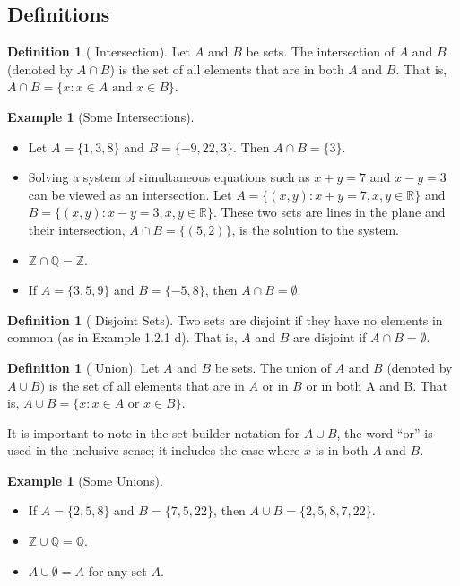 \documentclass[10pt,]{book}
\theoremstyle{plain}
\theoremstyle{definition}
\newtheorem{definition}[theorem]{Definition}
\theoremstyle{definition}
\theoremstyle{definition}
\newtheorem{example}[theorem]{Example}
\theoremstyle{definition}
\begin{document}
\subsection[Definitions]{Definitions}\label{subsection-3}
\begin{definition}[ Intersection]\label{def-intersection}
\label{notation-6}
 Let \(A\) and \(B\) be sets. The intersection of \(A\) and \(B\) (denoted by \(A \cap  B\)) is the set of all elements
that are in both \(A\) and \(B\). That is, \(A \cap  B = \{x:x \in  A \textrm{ and } x \in  B\}\). %
\end{definition}
\begin{example}[Some Intersections]\label{some_intersections}
\leavevmode%
\begin{itemize}[label=\textbullet]
\item{} Let \(A = \{1, 3, 8\}\) and \(B = \{-9, 22, 3\}\). Then \(A \cap  B = \{3\}\).%
\item{}Solving a system of simultaneous equations such as \(x + y = 7\) and \(x - y = 3\) can be viewed as an intersection. Let \(A = \{(x,y): x + y = 7, x,y \in  \mathbb{R}\}\) and \(B = \{(x,y): x - y = 3, x,y\in  \mathbb{R}\}\). These two sets are lines in the plane and their intersection,
\(A \cap  B = \{(5, 2)\}\), is the solution to the system. %
\item{} \(\mathbb{Z}\cap \mathbb{Q}=\mathbb{Z}\). %
\item{}If \(A = \{3, 5, 9\}\) and \(B = \{-5, 8\}\), then \(A\cap  B =\emptyset\). %
\end{itemize}
%
\end{example}
\begin{definition}[ Disjoint Sets]\label{def-disjoint-sets}
Two sets are disjoint if they have no elements in common (as in Example 1.2.1 d). That is, \(A\) and \(B\) are disjoint if \(A \cap  B = \emptyset\).%
\end{definition}
\begin{definition}[ Union]\label{def-union}
\label{notation-7}
 Let \(A\) and \(B\) be sets. The union of \(A\) and \(B\) (denoted by \(A \cup  B\)) is the set of all elements that are
in \(A\) or in \(B\) or in both A and B. That is, \(A\cup B= \{x:x \in  A\textrm{ or } x\in  B\}\). %
\end{definition}
It is important to note in the set-builder notation for \(A\cup B\), the word ``or'' is used in the inclusive sense; it includes the case where \( x\) is in both \(A\) and \(B\).%
\begin{example}[Some Unions]\label{some_unions}
\leavevmode%
\begin{itemize}[label=\textbullet]
\item{} If \(A = \{2, 5, 8\}\) and  \(B = \{7, 5, 22\}\), then \(A \cup  B = \{2, 5, 8, 7, 22\}\). %
\item{} \(\mathbb{Z}\cup \mathbb{Q}=\mathbb{Q}.\) %
\item{} \(A \cup \emptyset  = A\) for any set \(A\).%
\end{itemize}
%
\end{example}
\end{document}

